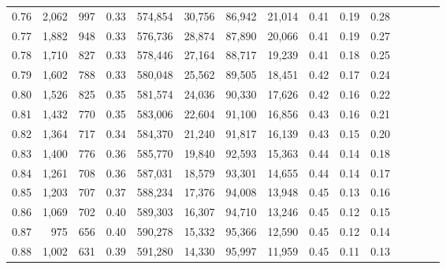 \begin{tabular}{rrrcrrrrrrrrrrr}
0.76 &   2,062 &    997 &                                       0.33 &  574,854 &   30,756 &   86,942 &   21,014 &  0.41 &  0.19 &                         0.28 \\
0.77 &   1,882 &    948 &                                       0.33 &  576,736 &   28,874 &   87,890 &   20,066 &  0.41 &  0.19 &                         0.27 \\
0.78 &   1,710 &    827 &                                       0.33 &  578,446 &   27,164 &   88,717 &   19,239 &  0.41 &  0.18 &                         0.25 \\
0.79 &   1,602 &    788 &                                       0.33 &  580,048 &   25,562 &   89,505 &   18,451 &  0.42 &  0.17 &                         0.24 \\
0.80 &   1,526 &    825 &                                       0.35 &  581,574 &   24,036 &   90,330 &   17,626 &  0.42 &  0.16 &                         0.22 \\
0.81 &   1,432 &    770 &                                       0.35 &  583,006 &   22,604 &   91,100 &   16,856 &  0.43 &  0.16 &                         0.21 \\
0.82 &   1,364 &    717 &                                       0.34 &  584,370 &   21,240 &   91,817 &   16,139 &  0.43 &  0.15 &                         0.20 \\
0.83 &   1,400 &    776 &                                       0.36 &  585,770 &   19,840 &   92,593 &   15,363 &  0.44 &  0.14 &                         0.18 \\
0.84 &   1,261 &    708 &                                       0.36 &  587,031 &   18,579 &   93,301 &   14,655 &  0.44 &  0.14 &                         0.17 \\
0.85 &   1,203 &    707 &                                       0.37 &  588,234 &   17,376 &   94,008 &   13,948 &  0.45 &  0.13 &                         0.16 \\
0.86 &   1,069 &    702 &                                       0.40 &  589,303 &   16,307 &   94,710 &   13,246 &  0.45 &  0.12 &                         0.15 \\
0.87 &     975 &    656 &                                       0.40 &  590,278 &   15,332 &   95,366 &   12,590 &  0.45 &  0.12 &                         0.14 \\
0.88 &   1,002 &    631 &                                       0.39 &  591,280 &   14,330 &   95,997 &   11,959 &  0.45 &  0.11 &                         0.13 \\

\end{tabular}
